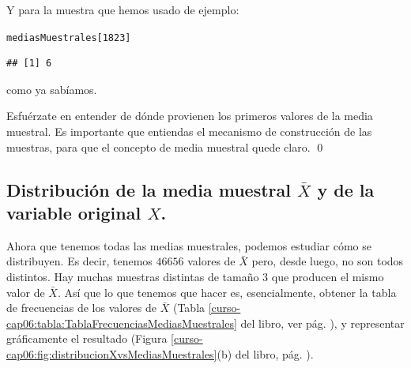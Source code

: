 \documentclass[10pt,a4paper]{article}\usepackage[]{graphicx}\usepackage[]{color}
\makeatletter
\newcommand{\hlnum}[1]{\textcolor[rgb]{0.686,0.059,0.569}{#1}}%
\newcommand{\hlstd}[1]{\textcolor[rgb]{0.345,0.345,0.345}{#1}}%
\newenvironment{kframe}{%
 \def\at@end@of@kframe{}%
 \ifinner\ifhmode%
  \def\at@end@of@kframe{\end{minipage}}%
  \begin{minipage}{\columnwidth}%
 \fi\fi%
 \def\FrameCommand##1{\hskip\@totalleftmargin \hskip-\fboxsep
 \colorbox{shadecolor}{##1}\hskip-\fboxsep
     \hskip-\linewidth \hskip-\@totalleftmargin \hskip\columnwidth}%
 \MakeFramed {\advance\hsize-\width
   \@totalleftmargin\z@ \linewidth\hsize
   \@setminipage}}%
 {\par\unskip\endMakeFramed%
 \at@end@of@kframe}
\newenvironment{knitrout}{}{} %
\makeatother
\begin{document}
Y para la muestra que hemos usado de ejemplo:
\begin{knitrout}
\color{fgcolor}\begin{kframe}
\begin{alltt}
\hlstd{mediasMuestrales[}\hlnum{1823}\hlstd{]}
\end{alltt}
\begin{verbatim}
## [1] 6
\end{verbatim}
\end{kframe}
\end{knitrout}
como ya sabíamos.

\begin{ejercicio}
\label{tut06:ejercicio01}
Esfuérzate en entender de dónde provienen los primeros valores de la media muestral. Es importante que entiendas el mecanismo de construcción de las muestras, para que el concepto de media muestral quede claro. %
\qed
\end{ejercicio}


\subsection{Distribución de la media muestral $\bar X$ y de la variable original $X$.}
\label{tut06:subsec:DistribucionMediaMuestralVariableOriginal}

Ahora que tenemos todas las medias muestrales, podemos estudiar cómo se distribuyen. Es decir, tenemos $46656$ valores de $\bar X$ pero, desde luego, no son todos distintos. Hay muchas muestras distintas de tamaño $3$ que producen el mismo valor de $\bar X$. Así que lo que tenemos que hacer es, esencialmente, obtener la tabla de frecuencias de los valores de $\bar X$ (Tabla \ref{curso-cap06:tabla:TablaFrecuenciasMediasMuestrales} del libro, ver pág. \pageref{curso-cap06:tabla:TablaFrecuenciasMediasMuestrales}), y representar gráficamente el resultado  (Figura \ref{curso-cap06:fig:distribucionXvsMediasMuestrales}(b) del libro, pág. \pageref{curso-cap06:fig:distribucionXvsMediasMuestrales}).
\end{document}
